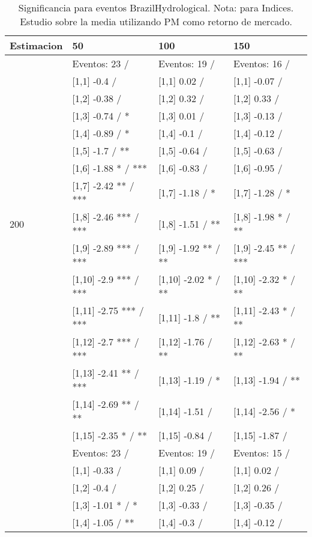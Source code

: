 \begin{table}

\caption{Significancia para eventos BrazilHydrological. Nota: para Indices. Estudio sobre la media utilizando PM como retorno de mercado.}
\centering
\begin{tabular}[t]{llll}
\toprule
Estimacion & 50 & 100 & 150\\
\midrule
 & Eventos:  23 / & Eventos:  19 / & Eventos:  16 /\\
 & {}[1,1] -0.4  / & {}[1,1] 0.02  / & {}[1,1] -0.07  /\\
 & {}[1,2] -0.38  / & {}[1,2] 0.32  / & {}[1,2] 0.33  /\\
 & {}[1,3] -0.74  / * & {}[1,3] 0.01  / & {}[1,3] -0.13  /\\
 & {}[1,4] -0.89  / * & {}[1,4] -0.1  / & {}[1,4] -0.12  /\\
\addlinespace
 & {}[1,5] -1.7  / ** & {}[1,5] -0.64  / & {}[1,5] -0.63  /\\
 & {}[1,6] -1.88 * / *** & {}[1,6] -0.83  / & {}[1,6] -0.95  /\\
 & {}[1,7] -2.42 ** / *** & {}[1,7] -1.18  / * & {}[1,7] -1.28  / *\\
200 & {}[1,8] -2.46 *** / *** & {}[1,8] -1.51  / ** & {}[1,8] -1.98 * / **\\
 & {}[1,9] -2.89 *** / *** & {}[1,9] -1.92 ** / ** & {}[1,9] -2.45 ** / ***\\
\addlinespace
 & {}[1,10] -2.9 *** / *** & {}[1,10] -2.02 * / ** & {}[1,10] -2.32 * / **\\
 & {}[1,11] -2.75 *** / *** & {}[1,11] -1.8  / ** & {}[1,11] -2.43 * / **\\
 & {}[1,12] -2.7 *** / *** & {}[1,12] -1.76  / ** & {}[1,12] -2.63 * / **\\
 & {}[1,13] -2.41 ** / *** & {}[1,13] -1.19  / * & {}[1,13] -1.94  / **\\
 & {}[1,14] -2.69 ** / ** & {}[1,14] -1.51  / & {}[1,14] -2.56  / *\\
\addlinespace
 & {}[1,15] -2.35 * / ** & {}[1,15] -0.84  / & {}[1,15] -1.87  /\\
 & Eventos:  23 / & Eventos:  19 / & Eventos:  15 /\\
 & {}[1,1] -0.33  / & {}[1,1] 0.09  / & {}[1,1] 0.02  /\\
 & {}[1,2] -0.4  / & {}[1,2] 0.25  / & {}[1,2] 0.26  /\\
 & {}[1,3] -1.01 * / * & {}[1,3] -0.33  / & {}[1,3] -0.35  /\\
\addlinespace
 & {}[1,4] -1.05  / ** & {}[1,4] -0.3  / & {}[1,4] -0.12  /\\

\end{tabular}
\end{table}
